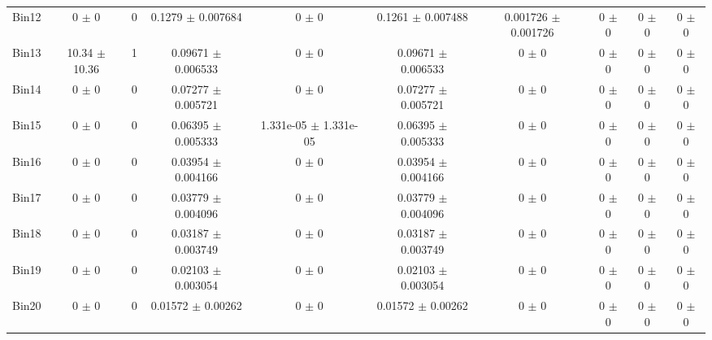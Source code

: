 \begin{tabular}{@{\extracolsep{4pt}}lccccccccc@{}}
     Bin12 & 0 $\pm$ 0 & 0 & 0.1279 $\pm$ 0.007684 & 0 $\pm$ 0 & 0.1261 $\pm$ 0.007488 & 0.001726 $\pm$ 0.001726 & 0 $\pm$ 0 & 0 $\pm$ 0 & 0 $\pm$ 0 \\ 
     Bin13 & 10.34 $\pm$ 10.36 & 1 & 0.09671 $\pm$ 0.006533 & 0 $\pm$ 0 & 0.09671 $\pm$ 0.006533 & 0 $\pm$ 0 & 0 $\pm$ 0 & 0 $\pm$ 0 & 0 $\pm$ 0 \\ 
     Bin14 & 0 $\pm$ 0 & 0 & 0.07277 $\pm$ 0.005721 & 0 $\pm$ 0 & 0.07277 $\pm$ 0.005721 & 0 $\pm$ 0 & 0 $\pm$ 0 & 0 $\pm$ 0 & 0 $\pm$ 0 \\ 
     Bin15 & 0 $\pm$ 0 & 0 & 0.06395 $\pm$ 0.005333 & 1.331e-05 $\pm$ 1.331e-05 & 0.06395 $\pm$ 0.005333 & 0 $\pm$ 0 & 0 $\pm$ 0 & 0 $\pm$ 0 & 0 $\pm$ 0 \\ 
     Bin16 & 0 $\pm$ 0 & 0 & 0.03954 $\pm$ 0.004166 & 0 $\pm$ 0 & 0.03954 $\pm$ 0.004166 & 0 $\pm$ 0 & 0 $\pm$ 0 & 0 $\pm$ 0 & 0 $\pm$ 0 \\ 
     Bin17 & 0 $\pm$ 0 & 0 & 0.03779 $\pm$ 0.004096 & 0 $\pm$ 0 & 0.03779 $\pm$ 0.004096 & 0 $\pm$ 0 & 0 $\pm$ 0 & 0 $\pm$ 0 & 0 $\pm$ 0 \\ 
     Bin18 & 0 $\pm$ 0 & 0 & 0.03187 $\pm$ 0.003749 & 0 $\pm$ 0 & 0.03187 $\pm$ 0.003749 & 0 $\pm$ 0 & 0 $\pm$ 0 & 0 $\pm$ 0 & 0 $\pm$ 0 \\ 
     Bin19 & 0 $\pm$ 0 & 0 & 0.02103 $\pm$ 0.003054 & 0 $\pm$ 0 & 0.02103 $\pm$ 0.003054 & 0 $\pm$ 0 & 0 $\pm$ 0 & 0 $\pm$ 0 & 0 $\pm$ 0 \\ 
     Bin20 & 0 $\pm$ 0 & 0 & 0.01572 $\pm$ 0.00262 & 0 $\pm$ 0 & 0.01572 $\pm$ 0.00262 & 0 $\pm$ 0 & 0 $\pm$ 0 & 0 $\pm$ 0 & 0 $\pm$ 0 \\ 
\hline\hline
  \end{tabular}
